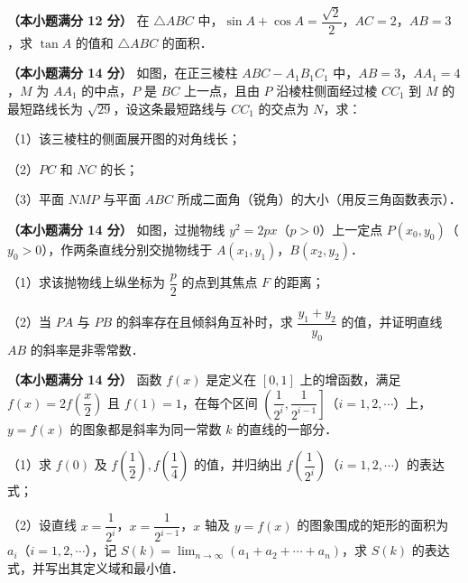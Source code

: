 \begin{question}
\textbf{（本小题满分 12 分）} 
在 $\triangle ABC$ 中，$\sin A+\cos A=\dfrac{\sqrt{2}}{2}$，$AC=2$，$AB=3$，求 $\tan A$ 的值和 $\triangle ABC$ 的面积．

\Needspace{0.4\textheight}
\end{question}
\begin{question}
\textbf{（本小题满分 14 分）} 
如图，在正三棱柱 $ABC-A_1B_1C_1$ 中，$AB=3$，$AA_1=4$，$M$ 为 $AA_1$ 的中点，$P$ 是 $BC$ 上一点，且由 $P$ 沿棱柱侧面经过棱 $CC_1$ 到 $M$ 的最短路线长为 $\sqrt{29}$，设这条最短路线与 $CC_1$ 的交点为 $N$，求：

（1）该三棱柱的侧面展开图的对角线长；

（2）$PC$ 和 $NC$ 的长；

（3）平面 $NMP$ 与平面 $ABC$ 所成二面角（锐角）的大小（用反三角函数表示）．
\nopagebreak[4]
\begin{center}\end{center}
\nopagebreak[4]
\Needspace{0.4\textheight}
\end{question}
\begin{question}
\textbf{（本小题满分 14 分）} 
如图，过抛物线 $y^2=2px$（$p>0$）上一定点 $P(x_0, y_0)$（$y_0>0$），作两条直线分别交抛物线于 $A(x_1, y_1)$，$B(x_2, y_2)$．

（1）求该抛物线上纵坐标为 $\dfrac{p}{2}$ 的点到其焦点 $F$ 的距离；

（2）当 $PA$ 与 $PB$ 的斜率存在且倾斜角互补时，求 $\dfrac{y_1+y_2}{y_0}$ 的值，并证明直线 $AB$ 的斜率是非零常数．
\nopagebreak[4]
\begin{center}\end{center}
\nopagebreak[4]
\end{question}
\begin{question}
\textbf{（本小题满分 14 分）} 
函数 $f(x)$ 是定义在 $[0, 1]$ 上的增函数，满足 $f(x)=2f\left(\dfrac{x}{2}\right)$ 且 $f(1)=1$，在每个区间 $\left(\dfrac{1}{2^i}, \dfrac{1}{2^{i-1}}\right]$（$i=1, 2, \cdots$）上，$y=f(x)$ 的图象都是斜率为同一常数 $k$ 的直线的一部分．

（1）求 $f(0)$ 及 $f\left(\dfrac{1}{2}\right), f\left(\dfrac{1}{4}\right)$ 的值，并归纳出 $f\left(\dfrac{1}{2^i}\right)$（$i=1, 2, \cdots$）的表达式；

（2）设直线 $x=\dfrac{1}{2^i}$，$x=\dfrac{1}{2^{i-1}}$，$x$ 轴及 $y=f(x)$ 的图象围成的矩形的面积为 $a_i$（$i=1, 2, \cdots$），记 $S(k)=\lim_{n\to\infty}(a_1+a_2+\cdots+a_n)$，求 $S(k)$ 的表达式，并写出其定义域和最小值．

\end{question}
